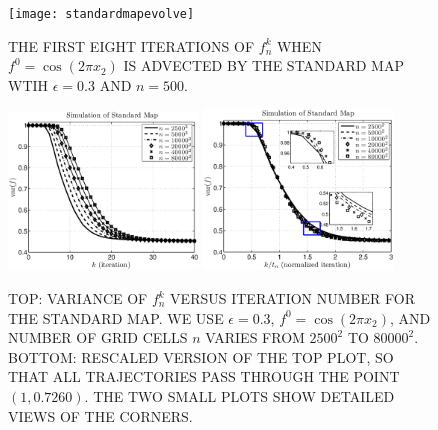 \documentclass[twocolumn,10pt]{asme2e}
\begin{document}


\begin{figure}
      \texttt{[image: standardmapevolve]}
     \caption{\label{standardmapevolve} THE FIRST EIGHT ITERATIONS OF
       $f^k_n$ WHEN $f^0 = \cos(2\pi x_2)$ IS ADVECTED BY THE STANDARD
       MAP WTIH $\epsilon=0.3$ AND $n = 500$.}
\end{figure}

\begin{figure}
      \includegraphics[width=0.45\textwidth]{standardmapcutoff}
      \includegraphics[width=0.45\textwidth]{standardmapcutoffn}
    \caption{\label{standardmapun} TOP: VARIANCE OF $f_n^k$ VERSUS
      ITERATION NUMBER FOR THE STANDARD MAP. WE USE $\epsilon=0.3$,
      $f^0=\cos(2 \pi x_2)$, AND NUMBER OF GRID CELLS $n$ VARIES FROM
      $2500^2$ TO $80000^2$. BOTTOM: RESCALED VERSION OF THE TOP PLOT,
      SO THAT ALL TRAJECTORIES PASS THROUGH THE POINT
      $(1,0.7260)$. THE TWO SMALL PLOTS SHOW DETAILED VIEWS OF THE
      CORNERS.}
\end{figure}
\end{document}
